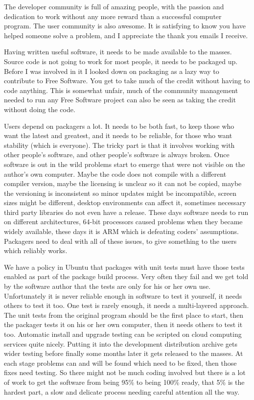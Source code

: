 The developer community is full of amazing people, with the passion and
dedication to work without any more reward than a successful computer program.
The user community is also awesome. It is satisfying to know you have helped
someone solve a problem, and I appreciate the thank you emails I receive.

Having written useful software, it needs to be made available to the masses.
Source code is not going to work for most people, it needs to be packaged up.
Before I was involved in it I looked down on packaging as a lazy way to
contribute to Free Software. You get to take much of the credit without having
to code anything. This is somewhat unfair, much of the community management
needed to run any Free Software project can also be seen as taking the credit
without doing the code.

Users depend on packagers a lot. It needs to be both fast, to keep those who
want the latest and greatest, and it needs to be reliable, for those who want
stability (which is everyone). The tricky part is that it involves working with
other people’s software, and other people’s software is always broken. Once
software is out in the wild problems start to emerge that were not visible on
the author’s own computer. Maybe the code does not compile with a different
compiler version, maybe the licensing is unclear so it can not be copied, maybe
the versioning is inconsistent so minor updates might be incompatible, screen
sizes might be different, desktop environments can affect it, sometimes
necessary third party libraries do not even have a release. These days software
needs to run on different architectures, 64-bit processors caused problems when
they became widely available, these days it is ARM which is defeating coders’
assumptions. Packagers need to deal with all of these issues, to give something
to the users which reliably works.

We have a policy in Ubuntu that packages with unit tests must have those tests
enabled as part of the package build process. Very often they fail and we get
told by the software author that the tests are only for his or her own use.
Unfortunately it is never reliable enough in software to test it yourself, it
needs others to test it too. One test is rarely enough, it needs a multi-layered
approach. The unit tests from the original program should be the first place to
start, then the packager tests it on his or her own computer, then it needs
others to test it too. Automatic install and upgrade testing can be scripted on
cloud computing services quite nicely. Putting it into the development
distribution archive gets wider testing before finally some months later it gets
released to the masses. At each stage problems can and will be found which need
to be fixed, then those fixes need testing. So there might not be much coding
involved but there is a lot of work to get the software from being 95\% to being
100\% ready, that 5\% is the hardest part, a slow and delicate process needing
careful attention all the way.

